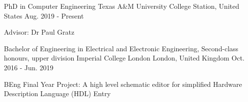 
\begin{cventries}
\cventry
    {PhD in Computer Engineering} %
    {Texas A\&M University} %
    {College Station, United States} %
    {Aug. 2019 - Present} %
    {
      \begin{cvitems} %
         \item {Advisor: Dr Paul Gratz}
      \end{cvitems}
    }
  \cventry
    {Bachelor of Engineering in Electrical and Electronic Engineering, Second-class honours, upper division} %
    {Imperial College London} %
    {London, United Kingdom} %
    {Oct. 2016 - Jun. 2019} %
    {
      \begin{cvitems} %
         \item {BEng Final Year Project: A high level schematic editor for simplified Hardware Description Language (HDL) Entry}
      \end{cvitems}
    }
\end{cventries}
